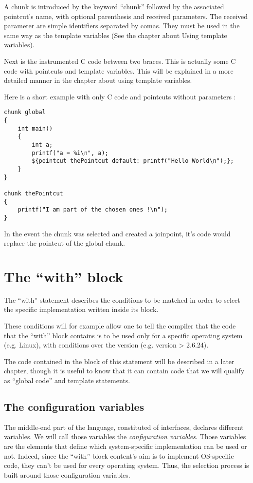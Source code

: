 \documentclass[american]{rtxreport}
\begin{document}
A chunk is introduced by the keyword ``chunk'' followed by the associated
pointcut's name, with optional parenthesis and received parameters. The
received parameter are simple identifiers separated by comas. They must be used
in the same way as the template variables (See the chapter about Using template
variables).

Next is the instrumented C code between two braces. This is actually some C
code with pointcuts and template variables. This will be explained in a more
detailed manner in the chapter about using template variables.

Here is a short example with only C code and pointcuts without parameters :
\begin{lstlisting}
chunk global
{
    int main()
    {
        int a;
        printf("a = %i\n", a);
        ${pointcut thePointcut default: printf("Hello World\n");};
    }
}

chunk thePointcut
{
    printf("I am part of the chosen ones !\n");
}
\end{lstlisting}

In the event the chunk was selected and created a joinpoint, it's code would
replace the pointcut of the global chunk.


\chapter{The ``with'' block}

The ``with'' statement describes the conditions to be matched in order to select
the specific implementation written inside its block.

These conditions will for example allow one to tell the compiler that the code
that the ``with'' block contains is to be used only for a specific operating
system (e.g. Linux), with conditions over the version (e.g. version > 2.6.24).

The code contained in the block of this statement will be described in a later
chapter, though it is useful to know that it can contain code that we will
qualify as ``global code'' and template statements.

\section{The configuration variables}

The middle-end part of the language, constituted of interfaces, declares
different variables. We will call those variables the \emph{configuration
variables}. Those variables are the elements that define which system-specific
implementation can be used or not. Indeed, since the ``with'' block content's
aim is to implement OS-specific code, they can't be used for every operating
system.  Thus, the selection process is built around those configuration
variables.
\end{document}
